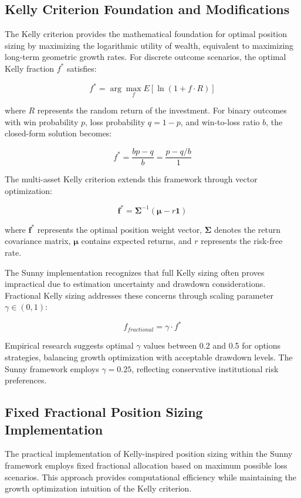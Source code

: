 \documentclass[
  american,
  11pt,
  11pt,
  letterpaper,
  onecolumn]{article}
\begin{document}
\subsection{Kelly Criterion Foundation and
Modifications}\label{kelly-criterion-foundation-and-modifications}

The Kelly criterion provides the mathematical foundation for optimal
position sizing by maximizing the logarithmic utility of wealth,
equivalent to maximizing long-term geometric growth rates. For discrete
outcome scenarios, the optimal Kelly fraction \(f^*\) satisfies:

\[f^* = \arg\max_{f} E[\ln(1 + f \cdot R)]\]

where \(R\) represents the random return of the investment. For binary
outcomes with win probability \(p\), loss probability \(q = 1-p\), and
win-to-loss ratio \(b\), the closed-form solution becomes:

\[f^* = \frac{bp - q}{b} = \frac{p - q/b}{1}\]

The multi-asset Kelly criterion extends this framework through vector
optimization:

\[\mathbf{f}^* = \mathbf{\Sigma}^{-1}(\mathbf{\mu} - r\mathbf{1})\]

where \(\mathbf{f}^*\) represents the optimal position weight vector,
\(\mathbf{\Sigma}\) denotes the return covariance matrix,
\(\mathbf{\mu}\) contains expected returns, and \(r\) represents the
risk-free rate.

The Sunny implementation recognizes that full Kelly sizing often proves
impractical due to estimation uncertainty and drawdown considerations.
Fractional Kelly sizing addresses these concerns through scaling
parameter \(\gamma \in (0,1)\):

\[f_{fractional} = \gamma \cdot f^*\]

Empirical research suggests optimal \(\gamma\) values between 0.2 and
0.5 for options strategies, balancing growth optimization with
acceptable drawdown levels. The Sunny framework employs
\(\gamma = 0.25\), reflecting conservative institutional risk
preferences.

\subsection{Fixed Fractional Position Sizing
Implementation}\label{fixed-fractional-position-sizing-implementation}

The practical implementation of Kelly-inspired position sizing within
the Sunny framework employs fixed fractional allocation based on maximum
possible loss scenarios. This approach provides computational efficiency
while maintaining the growth optimization intuition of the Kelly
criterion.
\end{document}
